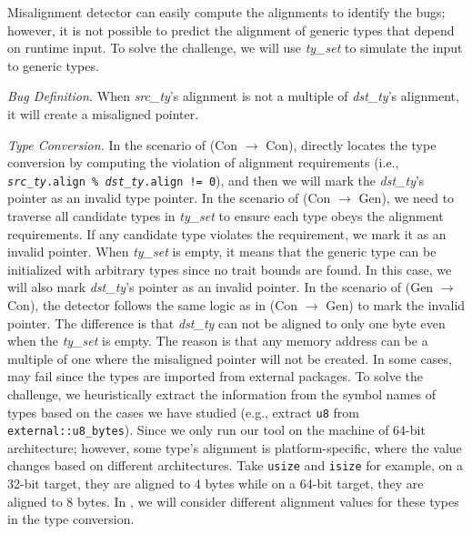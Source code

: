 \vspace{0.05in}
Misalignment detector can easily compute the alignments to identify the bugs; however, it is not possible to predict the alignment of generic types that depend on runtime input. To solve the challenge, we will use \textit{ty\_set} to simulate the input to generic types.

\noindent\emph{Bug Definition.}
When \textit{src\_ty}'s alignment is not a multiple of \textit{dst\_ty}'s alignment, it will create a misaligned pointer. 

\noindent\emph{Type Conversion.}
In the scenario of (Con $\rightarrow$ Con), \bdone directly locates the type conversion by computing the violation of alignment requirements (i.e., \texttt{\textit{src\_ty}.align \% \textit{dst\_ty}.align != 0}), and then we will mark the \textit{dst\_ty}'s pointer as an invalid type pointer.
% 
In the scenario of (Con $\rightarrow$ Gen), we need to traverse all candidate types in \textit{ty\_set} to ensure each type obeys the alignment requirements. If any candidate type violates the requirement, we mark it as an invalid pointer. When \textit{ty\_set} is empty, it means that the generic type can be initialized with arbitrary types since no trait bounds are found. In this case, we will also mark \textit{dst\_ty}'s pointer as an invalid pointer.
%
In the scenario of (Gen $\rightarrow$ Con), the detector follows the same logic as in (Con $\rightarrow$ Gen) to mark the invalid pointer. The difference is that \textit{dst\_ty} can not be aligned to only one byte even when the \textit{ty\_set} is empty. The reason is that any memory address can be a multiple of one where the misaligned pointer will not be created.
%
In some cases, \bdone may fail since the types are imported from external packages. To solve the challenge, we heuristically extract the information from the symbol names of types based on the cases we have studied (e.g., extract \texttt{u8} from \texttt{external::u8\_bytes}).
%
Since we only run our tool on the machine of 64-bit architecture; however, some type's alignment is platform-specific, where the value changes based on different architectures.
Take \texttt{usize} and \texttt{isize} for example, on a 32-bit target, they are aligned to 4 bytes while on a 64-bit target, they are aligned to 8 bytes.
In \Bdone, we will consider different alignment values for these types in the type conversion.
%


